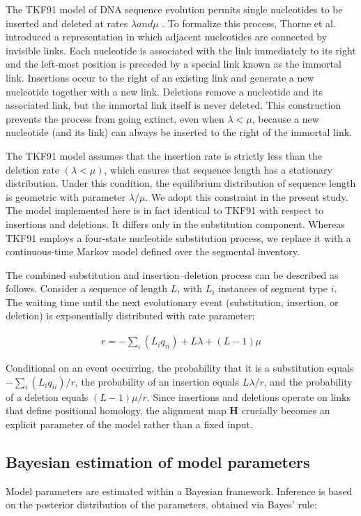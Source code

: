 \documentclass[numsec,webpdf,modern,large,namedate]{oup-authoring-template}
\begin{document}
The TKF91 model of DNA sequence evolution permits single nucleotides to be inserted and deleted at rates $\lambda  and \mu $ \citep{Thorne1991}. To formalize this process, Thorne et al. introduced a representation in which adjacent nucleotides are connected by invisible links. Each nucleotide is associated with the link immediately to its right and the left-most position is preceded by a special link known as the immortal link. Insertions occur to the right of an existing link and generate a new nucleotide together with a new link. Deletions remove a nucleotide and its associated link, but the immortal link itself is never deleted. This construction prevents the process from going extinct, even when $\lambda < \mu $, because a new nucleotide (and its link) can always be inserted to the right of the immortal link. 

The TKF91 model assumes that the insertion rate is strictly less than the deletion rate $(\lambda < \mu )$, which ensures that sequence length has a stationary distribution. Under this condition, the equilibrium distribution of sequence length is geometric with parameter $\lambda / \mu $. We adopt this constraint in the present study. The model implemented here is in fact identical to TKF91 with respect to insertions and deletions. It differs only in the substitution component. Whereas TKF91 employs a four-state nucleotide substitution process, we replace it with a continuous-time Markov model defined over the segmental inventory. 

The combined substitution and insertion--deletion process can be described as follows. Consider a sequence of length $L$, with $L_i$ instances of segment type $i$. The waiting time until the next evolutionary event (substitution, insertion, or deletion) is exponentially distributed with rate parameter: 

\begin{align}
r= - \sum _i{(L_iq_{ii})}+ L\lambda + (L- 1)\mu 
\end{align}

Conditional on an event occurring, the probability that it is a substitution equals $- \sum _i{(L_iq_{ii})}/ r$, the probability of an insertion equals $L\lambda / r$, and the probability of a deletion equals $(L- 1)\mu / r$. Since insertions and deletions operate on links that define positional homology, the alignment map $\mathbf{H}$ crucially becomes an explicit parameter of the model rather than a fixed input. 

\subsection{Bayesian estimation of model parameters}
\label{PaperSections_BayesianParameters}
Model parameters are estimated within a Bayesian framework. Inference is based on the posterior distribution of the parameters, obtained via Bayes’ rule:
\end{document}

